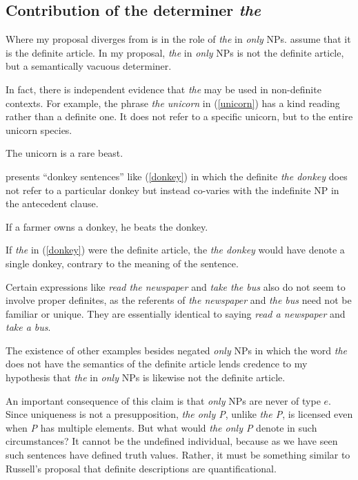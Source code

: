 \subsection{Contribution of the determiner \textit{the}}
Where my proposal diverges from  is in the role of \textit{the} in \textit{only} NPs. \citeauthor{cb2015} assume that it is the definite article. In my proposal, \textit{the} in \textit{only} NPs is not the definite article, but a semantically vacuous determiner.

In fact, there is independent evidence that \textit{the} may be used in non-definite contexts. For example, the phrase \textit{the unicorn} in (\ref{unicorn}) has a kind reading rather than a definite one. It does not refer to a specific unicorn, but to the entire unicorn species.

\begin{exe}
	\ex \label{unicorn} The unicorn is a rare beast.
\end{exe}

\citet{schwarz09} presents ``donkey sentences'' like (\ref{donkey}) in which the definite \textit{the donkey} does not refer to a particular donkey but instead co-varies with the indefinite NP in the antecedent clause.

\begin{exe}
	\ex \label{donkey} If a farmer owns a donkey, he beats the donkey.
\end{exe}

If \textit{the} in (\ref{donkey}) were the definite article, the \textit{the donkey} would have denote a single donkey, contrary to the meaning of the sentence.

Certain expressions like \textit{read the newspaper} and \textit{take the bus} also do not seem to involve proper definites, as the referents of \textit{the newspaper} and \textit{the bus} need not be familiar or unique. They are essentially identical to saying \textit{read a newspaper} and \textit{take a bus}.

The existence of other examples besides negated \textit{only} NPs in which the word \textit{the} does not have the semantics of the definite article lends credence to my hypothesis that \textit{the} in \textit{only} NPs is likewise not the definite article.

An important consequence of this claim is that \textit{only} NPs are never of type $e$. Since uniqueness is not a presupposition, \textit{the only P}, unlike \textit{the P}, is licensed even when \textit{P} has multiple elements. But what would \textit{the only P} denote in such circumstances? It cannot be the undefined individual, because as we have seen such sentences have defined truth values. Rather, it must be something similar to Russell's proposal that definite descriptions are quantificational.


